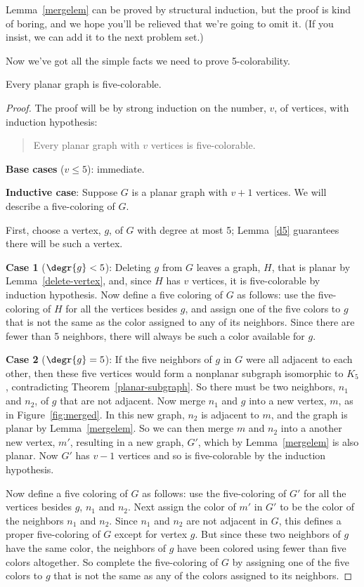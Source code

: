 Lemma~\ref{mergelem} can be proved by structural induction, but the proof
is kind of boring, and we hope you'll be relieved that we're going to omit
it.  (If you insist, we can add it to the next problem set.)

Now we've got all the simple facts we need to prove 5-colorability.
\begin{theorem}
Every planar graph is five-colorable.
\end{theorem}

\begin{proof}
The proof will be by strong induction on the number, $v$, of vertices, with
induction hypothesis:
\begin{quote}
Every planar graph with $v$ vertices is five-colorable.
\end{quote}

\textbf{Base cases} ($v \leq 5$): immediate.

\textbf{Inductive case}: Suppose $G$ is a planar graph with $v+1$
vertices.  We will describe a five-coloring of $G$.

First, choose a vertex, $g$, of $G$ with degree at most 5; Lemma~\ref{d5}
guarantees there will be such a vertex.

\textbf{Case 1} ($\degr{g}<5$): Deleting $g$ from $G$ leaves a graph, $H$,
that is planar by Lemma~\ref{delete-vertex}, and, since $H$ has $v$ vertices,
it is five-colorable by induction hypothesis.  Now define a five coloring
of $G$ as follows: use the five-coloring of $H$ for all the vertices besides
$g$, and assign one of the five colors to $g$ that is not the same as the
color assigned to any of its neighbors.  Since there are fewer than 5
neighbors, there will always be such a color available for $g$.

\textbf{Case 2} ($\degr{g}=5$): If the five neighbors of $g$ in $G$ were
all adjacent to each other, then these five vertices would form a
nonplanar subgraph isomorphic to $K_5$, contradicting
Theorem~\ref{planar-subgraph}.  So there must be two neighbors, $n_1$ and
$n_2$, of $g$ that are not adjacent.  Now merge $n_1$ and $g$ into a new
vertex, $m$, as in Figure~\ref{fig:merged}.  In this new graph, $n_2$ is
adjacent to $m$, and the graph is planar by Lemma~\ref{mergelem}.  So we
can then merge $m$ and $n_2$ into a another new vertex, $m'$, resulting in
a new graph, $G'$, which by Lemma~\ref{mergelem} is also planar.  Now $G'$
has $v-1$ vertices and so is five-colorable by the induction hypothesis.

Now define a five coloring of $G$ as follows: use the five-coloring of $G'$
for all the vertices besides $g$, $n_1$ and $n_2$.  Next assign the color
of $m'$ in $G'$ to be the color of the neighbors $n_1$ and $n_2$.  Since
$n_1$ and $n_2$ are not adjacent in $G$, this defines a proper
five-coloring of $G$ except for vertex $g$.  But since these two neighbors
of $g$ have the same color, the neighbors of $g$ have been colored using
fewer than five colors altogether.  So complete the five-coloring of $G$ by
assigning one of the five colors to $g$ that is not the same as any of the
colors assigned to its neighbors.

\end{proof}

